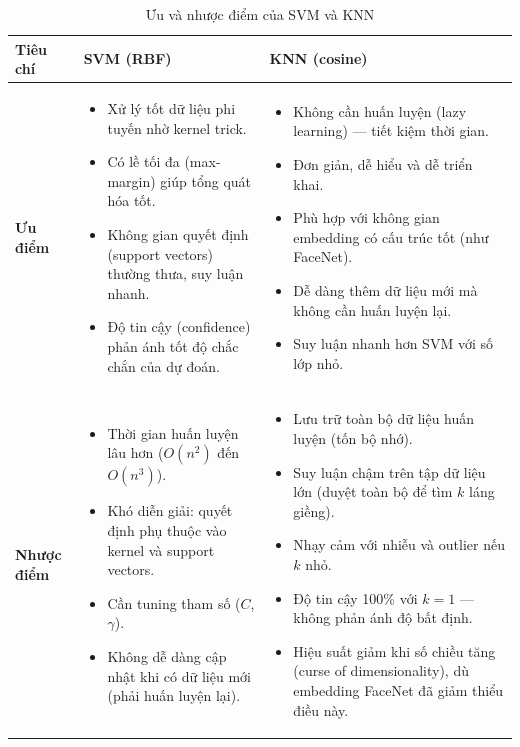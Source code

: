 \documentclass[12pt,a4paper]{article}
\begin{document}
\begin{table}[H]
    \centering
    \caption{Ưu và nhược điểm của SVM và KNN}
    \label{tab:swot}
    \begin{tabular}{p{3.5cm} p{5.5cm} p{5.5cm}}
        \toprule
        \textbf{Tiêu chí} & \textbf{SVM (RBF)} & \textbf{KNN (cosine)} \\
        \midrule
        \textbf{Ưu điểm} &
        \begin{itemize}
            \item Xử lý tốt dữ liệu phi tuyến nhờ kernel trick.
            \item Có lề tối đa (max-margin) giúp tổng quát hóa tốt.
            \item Không gian quyết định (support vectors) thường thưa, suy luận nhanh.
            \item Độ tin cậy (confidence) phản ánh tốt độ chắc chắn của dự đoán.
        \end{itemize} &
        \begin{itemize}
            \item Không cần huấn luyện (lazy learning) --- tiết kiệm thời gian.
            \item Đơn giản, dễ hiểu và dễ triển khai.
            \item Phù hợp với không gian embedding có cấu trúc tốt (như FaceNet).
            \item Dễ dàng thêm dữ liệu mới mà không cần huấn luyện lại.
            \item Suy luận nhanh hơn SVM với số lớp nhỏ.
        \end{itemize} \\
        \midrule
        \textbf{Nhược điểm} &
        \begin{itemize}
            \item Thời gian huấn luyện lâu hơn ($O(n^2)$ đến $O(n^3)$).
            \item Khó diễn giải: quyết định phụ thuộc vào kernel và support vectors.
            \item Cần tuning tham số ($C$, $\gamma$).
            \item Không dễ dàng cập nhật khi có dữ liệu mới (phải huấn luyện lại).
        \end{itemize} &
        \begin{itemize}
            \item Lưu trữ toàn bộ dữ liệu huấn luyện (tốn bộ nhớ).
            \item Suy luận chậm trên tập dữ liệu lớn (duyệt toàn bộ để tìm $k$ láng giềng).
            \item Nhạy cảm với nhiễu và outlier nếu $k$ nhỏ.
            \item Độ tin cậy 100\% với $k=1$ --- không phản ánh độ bất định.
            \item Hiệu suất giảm khi số chiều tăng (curse of dimensionality), dù embedding FaceNet đã giảm thiểu điều này.
        \end{itemize} \\
        \bottomrule
    \end{tabular}
\end{table}
\end{document}
